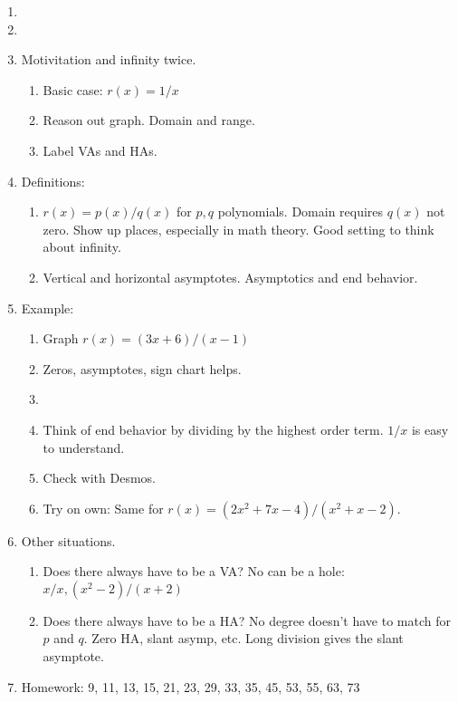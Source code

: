\documentclass{article}
\begin{document}
\begin{enumerate}

\item 

\item 

\item Motivitation and infinity twice.
\begin{enumerate}
\item Basic case: $r(x) = 1/x$
\item Reason out graph. Domain and range.
\item Label VAs and HAs. 
\end{enumerate}

\item Definitions:
\begin{enumerate}
\item $r(x) = p(x)/q(x)$ for $p,q$ polynomials. Domain requires $q(x)$ not zero. Show up places, especially in math theory. Good setting to think about infinity.
\item Vertical and horizontal asymptotes. Asymptotics and end behavior.
\end{enumerate}

\item Example:
\begin{enumerate}
\item Graph $r(x)=(3x+6)/(x-1)$
\item Zeros, asymptotes, sign chart helps.
\item \item Think of end behavior by dividing by the highest order term. $1/x$ is easy to understand.
\item Check with Desmos.
\item Try on own: Same for $r(x)=(2x^2+7x-4)/(x^2+x-2)$.
\end{enumerate}

\item Other situations.
\begin{enumerate}
\item Does there always have to be a VA? No can be a hole: $x/x, (x^2-2)/(x+2)$
\item Does there always have to be a HA? No degree doesn't have to match for $p$ and $q$. Zero HA, slant asymp, etc. Long division gives the slant asymptote.
\end{enumerate}

\item Homework: 9, 11, 13, 15, 21, 23, 29, 33, 35, 45, 53, 55, 63, 73

\end{enumerate}
\end{document}
